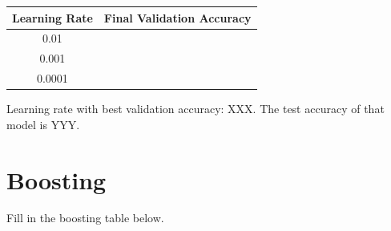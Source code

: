 \documentclass{article}
\begin{document}
\begin{center}
    \begin{tabular}{|c|c|}
        \hline
        Learning Rate & Final Validation Accuracy \\
        \hline
        0.01 & \\
        0.001 & \\
        0.0001 & \\
        \hline
    \end{tabular}
\end{center}
Learning rate with best validation accuracy: XXX.
The test accuracy of that model is YYY.

\section*{Boosting}
Fill in the boosting table below.
\end{document}
